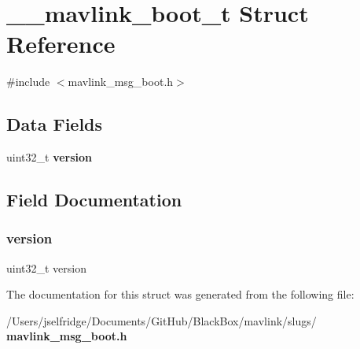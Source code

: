 \section{\+\_\+\+\_\+mavlink\+\_\+boot\+\_\+t Struct Reference}
\label{struct____mavlink__boot__t}


{\ttfamily \#include $<$mavlink\+\_\+msg\+\_\+boot.\+h$>$}

\subsection*{Data Fields}
\begin{DoxyCompactItemize}
\item 
uint32\+\_\+t \textbf{ version}
\end{DoxyCompactItemize}


\subsection{Field Documentation}
\mbox{\label{struct____mavlink__boot__t_acd99bb05ca015e7d74448acb1deba7ca}} 
\subsubsection{version}
{\footnotesize\ttfamily uint32\+\_\+t version}



The documentation for this struct was generated from the following file\+:\begin{DoxyCompactItemize}
\item 
/\+Users/jselfridge/\+Documents/\+Git\+Hub/\+Black\+Box/mavlink/slugs/\textbf{ mavlink\+\_\+msg\+\_\+boot.\+h}\end{DoxyCompactItemize}

